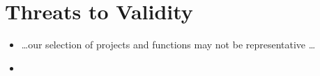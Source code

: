 \section{Threats to Validity}

\begin{itemize}
    \item \ldots our selection of projects and functions may not be representative \ldots
    \item {}
\end{itemize}